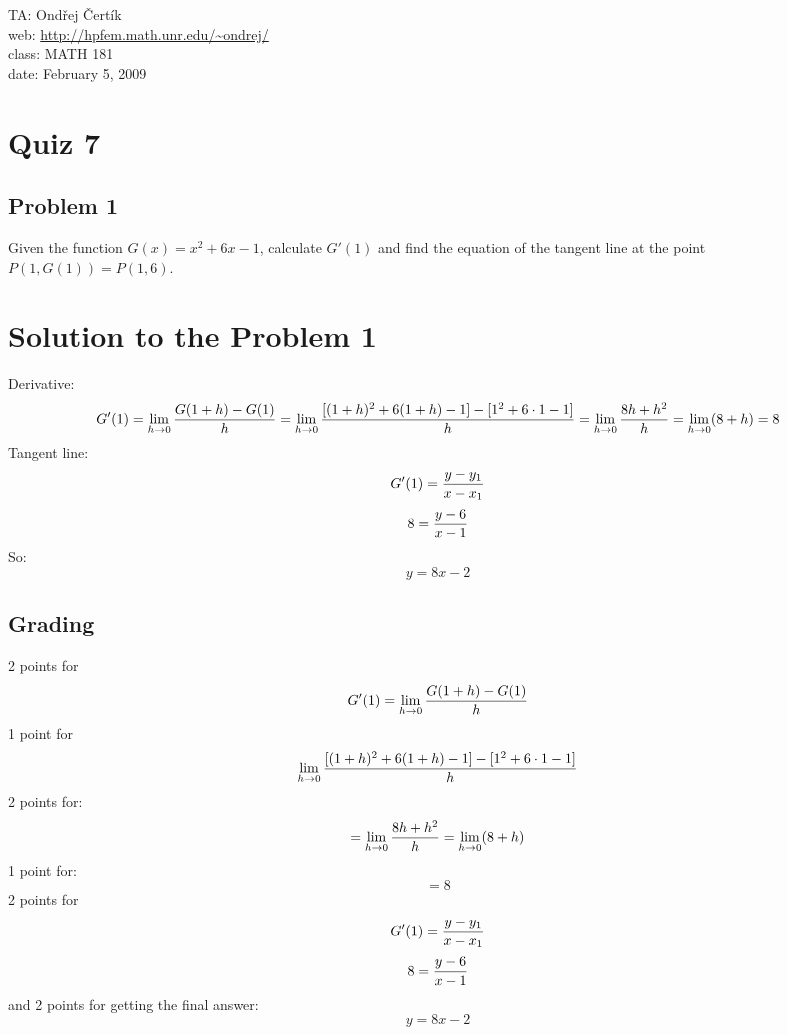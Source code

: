\documentclass[10pt]{article}
\begin{document}
\noindent TA: Ondřej Čertík\\
web: \url{http://hpfem.math.unr.edu/~ondrej/}\\
class: MATH 181\\
date: February 5, 2009

\section*{Quiz 7}

\subsection*{Problem 1}

Given the function $G(x)=x^2+6x-1$, calculate $G'(1)$ and find the equation of
the tangent line at the point $P(1, G(1)) = P(1, 6)$.

\section*{Solution to the Problem 1}

Derivative:
$$G'(1)
=\lim_{h\to0}{G(1+h)-G(1)\over h}
=\lim_{h\to0}{[(1+h)^2+6(1+h)-1]-[1^2+6\cdot1-1]\over h}
=\lim_{h\to0}{8h+h^2\over h}
=\lim_{h\to0}(8+h)
=8$$
Tangent line:
$$G'(1) = {y-y_1\over x-x_1}$$
$$8 = {y-6\over x-1}$$
So:
$$y=8x-2$$

\subsection*{Grading}

2 points for
$$G'(1)
=\lim_{h\to0}{G(1+h)-G(1)\over h}
$$
1 point for
$$
\lim_{h\to0}{[(1+h)^2+6(1+h)-1]-[1^2+6\cdot1-1]\over h}
$$
2 points for:
$$
=\lim_{h\to0}{8h+h^2\over h}
=\lim_{h\to0}(8+h)
$$
1 point for:
$$=8$$
2 points for
$$G'(1) = {y-y_1\over x-x_1}$$
$$8 = {y-6\over x-1}$$
and 2 points for getting the final answer:
$$y=8x-2$$
\end{document}
